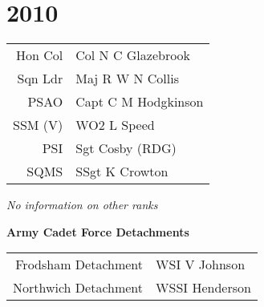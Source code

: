 \chapter*{2010}

\begin{center}
  \small
  \begin{tabular}{rl}
    Hon Col & Col N C Glazebrook \\
    Sqn Ldr & Maj R W N Collis \\
    PSAO & Capt C M Hodgkinson \\
    SSM (V) & WO2 L Speed \\
    PSI & Sgt Cosby (RDG) \\
    SQMS & SSgt K Crowton \\
  \end{tabular}
\end{center}

\begin{center}
  \textit{No information on other ranks}
\end{center}

\begin{center}
  \large
  \textbf{Army Cadet Force Detachments}
\end{center}

\begin{center}
  \small
  \begin{tabular}{rl}
    Frodsham Detachment & WSI V Johnson \\
    Northwich Detachment & WSSI Henderson \\
  \end{tabular}
\end{center}

\vspace{80mm}

\pagebreak
